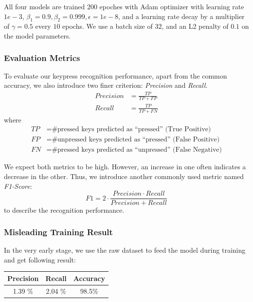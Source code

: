 \documentclass[10pt,twocolumn,letterpaper]{article}
\begin{document}
All four models are trained \(200\) epoches with Adam optimizer with learning rate \(1e-3\), \(\beta_1 = 0.9, \beta_2 = 0.999, \epsilon = 1e-8\), and a learning rate decay by a multiplier of \(\gamma=0.5\) every $10$ epochs. 
We use a batch size of \(32\), and an L2 penalty of \(0.1\) on the model parameters. 


\subsubsection{Evaluation Metrics}

To evaluate our keypress recognition performance, apart from the common accuracy, we also introduce two finer criterion: \textit{Precision} and \textit{Recall}.
\begin{align*}
   Precision &= \frac{TP}{TP+FP}\\
   Recall &= \frac{TP}{TP+FN}
\end{align*}
where
\begin{align*}
   TP &= \text{\# pressed keys predicted as ``pressed'' (True Positive)}\\
   FP &= \text{\# unpressed keys predicted as ``pressed'' (False Positive)}\\
   FN &= \text{\# pressed keys predicted as ``unpressed'' (False Negative)}
\end{align*}

We expect both metrics to be high. However, an increase in one often indicates a decrease in the other.
Thus, we introduce another commonly used metric named \textit{F1-Score}:
$$F1 = 2\cdot\dfrac{Precision\cdot Recall}{Precision + Recall}$$
to describe the recognition performance.

\subsubsection{Misleading Training Result}

In the very early stage, we use the raw dataset to feed the model during training and get following result:\\

\begin{minipage}{0.9\linewidth}
   \centering
\begin{tabular}{ccc}
   \toprule
   Precision &Recall&Accuracy\\
   \midrule
   1.39 \%& 2.04 \%&98.5\%\\
   \bottomrule
   \end{tabular}
    \label{tab:prevdataset}

\end{minipage}
\end{document}
